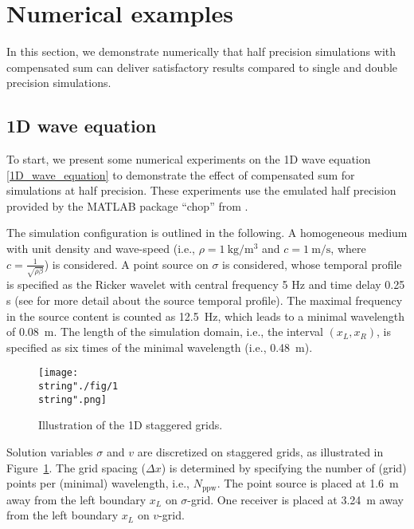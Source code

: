 \documentclass[10pt]{article}
\begin{document}
\section{Numerical examples}\label{sec_numerical}
%
In this section, we demonstrate numerically that half precision simulations with compensated sum can deliver satisfactory results compared to single and double precision simulations.
%

\subsection{1D wave equation}\label{sec_example_1D_configuration}
%
To start, we present some numerical experiments on the 1D wave equation \eqref{1D_wave_equation} to demonstrate the effect of compensated sum for simulations at half precision.
%
These experiments use the emulated half precision provided by the MATLAB package ``chop'' from \cite{higham2019simulating}.


The simulation configuration is outlined in the following. 
%
A homogeneous medium with unit density and wave-speed (i.e., $\rho = 1~\text{kg}/\text{m}^3$ and $c=1~\text{m}/\text{s}$, where $c = \frac{1}{\sqrt{\rho\beta}}$) is considered. 
%
A point source on $\sigma$ is considered, whose temporal profile is specified as the Ricker wavelet with central frequency 5 Hz and time delay 0.25 s (see \cite[p.~684]{gao2019combining} for more detail about the source temporal profile). 
%
The maximal frequency in the source content is counted as 12.5~Hz, which leads to a minimal wavelength of 0.08~m. The length of the simulation domain, i.e., the interval $(x_L, x_R)$, is specified as six times of the minimal wavelength (i.e., 0.48~m).


\begin{figure}[H]
\captionsetup{width=1\textwidth, font=footnotesize,labelfont=footnotesize}
\centering
%
\centering\texttt{[image: \\string"./fig/1\\string".png]}
%
\caption{Illustration of the 1D staggered grids.}
\label{fig1DGrid}
\end{figure}


Solution variables $\sigma$ and $v$ are discretized on staggered grids, as illustrated in Figure~\ref{fig1DGrid}.
%
The grid spacing ($\Delta x$) is determined by specifying the number of (grid) points per (minimal) wavelength, i.e., $N_\text{ppw}$. 
%
The point source is placed at 1.6~m away from the left boundary $x_L$ on $\sigma$-grid.
%
One receiver is placed at 3.24~m away from the left boundary $x_L$ on $v$-grid. 
\end{document}
